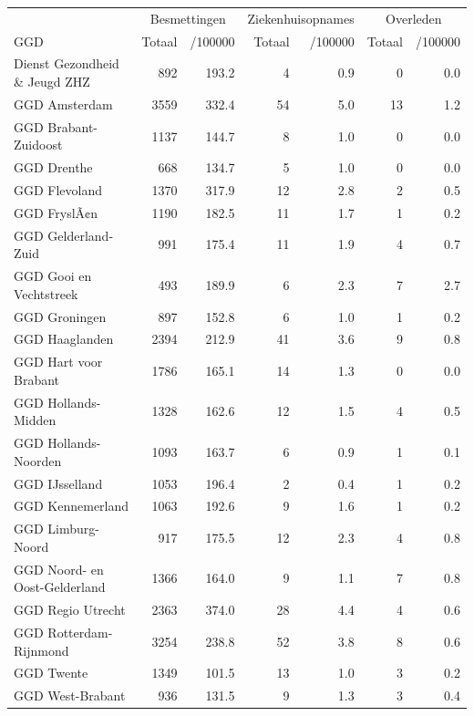 \documentclass[
  english,
  man,floatsintext]{apa6}
\begin{document}
\begin{table}
\centering\begingroup\fontsize{10}{12}\selectfont

\begin{threeparttable}
\begin{tabular}{lrrrrrr}
\toprule
\multicolumn{1}{c}{ } & \multicolumn{2}{c}{Besmettingen} & \multicolumn{2}{c}{Ziekenhuisopnames} & \multicolumn{2}{c}{Overleden} \\
\cmidrule(l{3pt}r{3pt}){2-3} \cmidrule(l{3pt}r{3pt}){4-5} \cmidrule(l{3pt}r{3pt}){6-7}
GGD & Totaal & /100000 & Totaal & /100000 & Totaal & /100000\\
\midrule
Dienst Gezondheid \& Jeugd ZHZ & 892 & 193.2 & 4 & 0.9 & 0 & 0.0\\
GGD Amsterdam & 3559 & 332.4 & 54 & 5.0 & 13 & 1.2\\
GGD Brabant-Zuidoost & 1137 & 144.7 & 8 & 1.0 & 0 & 0.0\\
GGD Drenthe & 668 & 134.7 & 5 & 1.0 & 0 & 0.0\\
GGD Flevoland & 1370 & 317.9 & 12 & 2.8 & 2 & 0.5\\
GGD FryslÃ¢n & 1190 & 182.5 & 11 & 1.7 & 1 & 0.2\\
GGD Gelderland-Zuid & 991 & 175.4 & 11 & 1.9 & 4 & 0.7\\
GGD Gooi en Vechtstreek & 493 & 189.9 & 6 & 2.3 & 7 & 2.7\\
GGD Groningen & 897 & 152.8 & 6 & 1.0 & 1 & 0.2\\
GGD Haaglanden & 2394 & 212.9 & 41 & 3.6 & 9 & 0.8\\
GGD Hart voor Brabant & 1786 & 165.1 & 14 & 1.3 & 0 & 0.0\\
GGD Hollands-Midden & 1328 & 162.6 & 12 & 1.5 & 4 & 0.5\\
GGD Hollands-Noorden & 1093 & 163.7 & 6 & 0.9 & 1 & 0.1\\
GGD IJsselland & 1053 & 196.4 & 2 & 0.4 & 1 & 0.2\\
GGD Kennemerland & 1063 & 192.6 & 9 & 1.6 & 1 & 0.2\\
GGD Limburg-Noord & 917 & 175.5 & 12 & 2.3 & 4 & 0.8\\
GGD Noord- en Oost-Gelderland & 1366 & 164.0 & 9 & 1.1 & 7 & 0.8\\
GGD Regio Utrecht & 2363 & 374.0 & 28 & 4.4 & 4 & 0.6\\
GGD Rotterdam-Rijnmond & 3254 & 238.8 & 52 & 3.8 & 8 & 0.6\\
GGD Twente & 1349 & 101.5 & 13 & 1.0 & 3 & 0.2\\
GGD West-Brabant & 936 & 131.5 & 9 & 1.3 & 3 & 0.4\\

\end{tabular}
\end{threeparttable}
\end{table}
\end{document}
